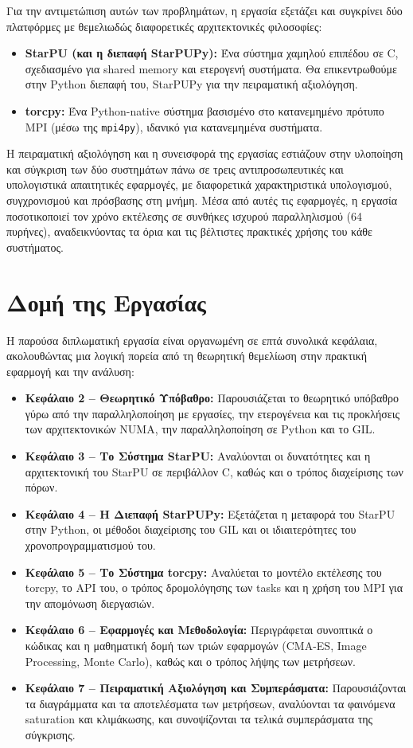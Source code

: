 Για την αντιμετώπιση αυτών των προβλημάτων, η εργασία εξετάζει και συγκρίνει δύο πλατφόρμες με θεμελιωδώς διαφορετικές αρχιτεκτονικές φιλοσοφίες:
\begin{itemize}
    \item \textbf{StarPU (και η διεπαφή StarPUPy):} Ένα σύστημα χαμηλού επιπέδου σε C, σχεδιασμένο για shared memory και ετερογενή συστήματα. Θα επικεντρωθούμε στην Python διεπαφή του, StarPUPy για την πειραματική αξιολόγηση.
    \item \textbf{torcpy:} Ένα Python-native σύστημα βασισμένο στο κατανεμημένο πρότυπο MPI (μέσω της \texttt{mpi4py}), ιδανικό για κατανεμημένα συστήματα.
\end{itemize}

Η πειραματική αξιολόγηση και η συνεισφορά της εργασίας εστιάζουν στην υλοποίηση και σύγκριση των δύο συστημάτων πάνω σε τρεις αντιπροσωπευτικές και υπολογιστικά απαιτητικές εφαρμογές, με διαφορετικά χαρακτηριστικά υπολογισμού, συγχρονισμού και πρόσβασης στη μνήμη. Μέσα από αυτές τις εφαρμογές, η εργασία ποσοτικοποιεί τον χρόνο εκτέλεσης σε συνθήκες ισχυρού παραλληλισμού (64 πυρήνες), αναδεικνύοντας τα όρια και τις βέλτιστες πρακτικές χρήσης του κάθε συστήματος.

\section{Δομή της Εργασίας}

Η παρούσα διπλωματική εργασία είναι οργανωμένη σε επτά συνολικά κεφάλαια, ακολουθώντας μια λογική πορεία από τη θεωρητική θεμελίωση στην πρακτική εφαρμογή και την ανάλυση:
\begin{itemize}
    \item \textbf{Κεφάλαιο 2 -- Θεωρητικό Υπόβαθρο:} Παρουσιάζεται το θεωρητικό υπόβαθρο γύρω από την παραλληλοποίηση με εργασίες, την ετερογένεια και τις προκλήσεις των αρχιτεκτονικών NUMA, την παραλληλοποίηση σε Python και το GIL.
    \item \textbf{Κεφάλαιο 3 -- Το Σύστημα StarPU:} Αναλύονται οι δυνατότητες και η αρχιτεκτονική του StarPU σε περιβάλλον C, καθώς και ο τρόπος διαχείρισης των πόρων.
    \item \textbf{Κεφάλαιο 4 -- Η Διεπαφή StarPUPy:} Εξετάζεται η μεταφορά του StarPU στην Python, οι μέθοδοι διαχείρισης του GIL και οι ιδιαιτερότητες του χρονοπρογραμματισμού του.
    \item \textbf{Κεφάλαιο 5 -- Το Σύστημα torcpy:} Αναλύεται το μοντέλο εκτέλεσης του torcpy, το API του, ο τρόπος δρομολόγησης των tasks και η χρήση του MPI για την απομόνωση διεργασιών.
    \item \textbf{Κεφάλαιο 6 -- Εφαρμογές και Μεθοδολογία:} Περιγράφεται συνοπτικά ο κώδικας και η μαθηματική δομή των τριών εφαρμογών (CMA-ES, Image Processing, Monte Carlo), καθώς και ο τρόπος λήψης των μετρήσεων.
    \item \textbf{Κεφάλαιο 7 -- Πειραματική Αξιολόγηση και Συμπεράσματα:} Παρουσιάζονται τα διαγράμματα και τα αποτελέσματα των μετρήσεων, αναλύονται τα φαινόμενα saturation και κλιμάκωσης, και συνοψίζονται τα τελικά συμπεράσματα της σύγκρισης.
\end{itemize}